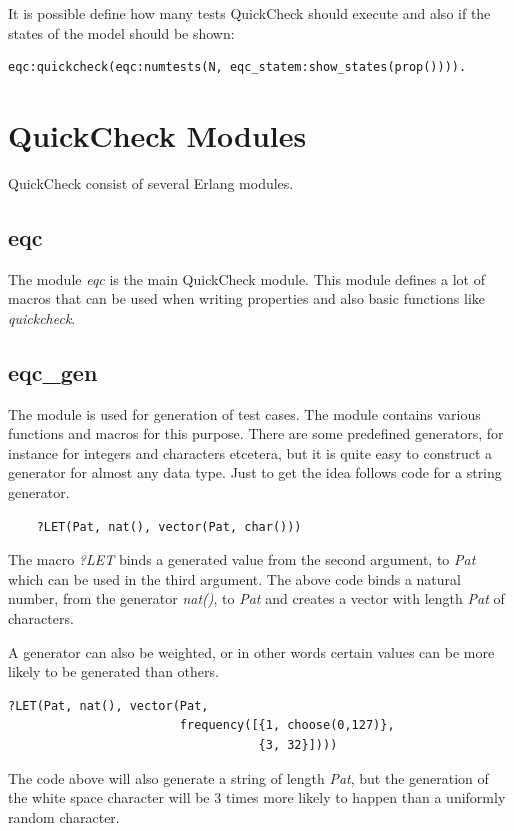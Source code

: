 It is possible define how many tests QuickCheck should execute and also if the
states of the model should be shown:
\begin{lstlisting}
eqc:quickcheck(eqc:numtests(N, eqc_statem:show_states(prop()))).
\end{lstlisting}

\section{QuickCheck Modules}
QuickCheck consist of several Erlang modules.
\subsection{eqc}
The module \emph{eqc} is the main QuickCheck module. This module defines a lot
of macros that can be used when writing properties and also basic functions
like \emph{quickcheck}.

\subsection{eqc\_gen} The module is used for generation of test cases. The module
contains various functions and macros for this purpose. There are some
predefined generators, for instance for integers and characters etcetera, but it
is quite easy to construct a generator for almost any data type. Just to get the
idea follows code for a string generator.
\begin{lstlisting}
    ?LET(Pat, nat(), vector(Pat, char()))
\end{lstlisting}
The macro \emph{?LET} binds a generated value from the second argument, to \emph{Pat} which can be
used in the third argument. The above code binds a natural number, from the
generator \emph{nat()}, to \emph{Pat} and creates a vector with length
\emph{Pat} of characters.

A generator can also be weighted, or in other words certain values can be more
likely to be generated than others.

\begin{lstlisting}
?LET(Pat, nat(), vector(Pat,
                        frequency([{1, choose(0,127)},
                                   {3, 32}])))
\end{lstlisting}
The code above will also generate a string of length \emph{Pat}, but the
generation of the white space character will be 3 times more likely to happen
than a uniformly random character.

